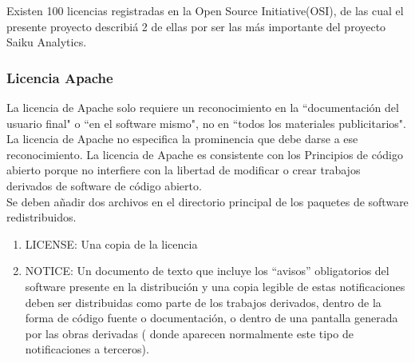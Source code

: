 \begin{spacing}{1.5}
	Existen 100 licencias registradas en la Open Source Initiative(OSI), de las cual el presente proyecto describi\'{a} 2 de ellas por ser las m\'{a}s importante del proyecto Saiku Analytics.

	\subsubsection{Licencia Apache}
	La licencia de Apache solo requiere un reconocimiento en la ``documentación del usuario final" o ``en el software mismo", no en ``todos los materiales publicitarios". La licencia de Apache no especifica la prominencia que debe darse a ese reconocimiento. La licencia de Apache es consistente con los Principios de código abierto porque no interfiere con la libertad de modificar o crear trabajos derivados de software de código abierto.\cite{chap2_apache_license}\\
	Se deben añadir dos archivos en el directorio principal de los paquetes de software redistribuidos.
	\begin{enumerate}
		\item LICENSE: Una copia de la licencia
		\item NOTICE: Un documento de texto que incluye los “avisos” obligatorios del software presente en la distribución y una copia legible de estas notificaciones deben ser distribuidas como parte de los trabajos derivados, dentro de la forma de código fuente o documentación, o dentro de una pantalla generada por las obras derivadas ( donde aparecen normalmente este tipo de notificaciones a terceros).
	\end{enumerate}			


\end{spacing}
